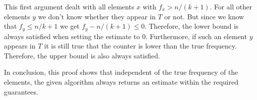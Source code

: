 \documentclass{article}
\begin{document}
This first argument dealt with all elements $x$ with $f_x > n/(k+1)$. For all other elements $y$ we don't know whether they appear in $T$ or not. But since we know that $f_y \leq n/k+1$ we get $f_y - n/(k+1) \leq 0$. Therefore, the lower bound is always satisfied when setting the estimate to 0. Furthermore, if such an element $y$ appears in $T$ it is still true that the counter is lower than the true frequency. Therefore, the upper bound is also always satisfied.

In conclusion, this proof shows that independent of the true frequency of the elements, the given algorithm always returns an estimate within the required guarantees.
% 
% 
\end{document}
